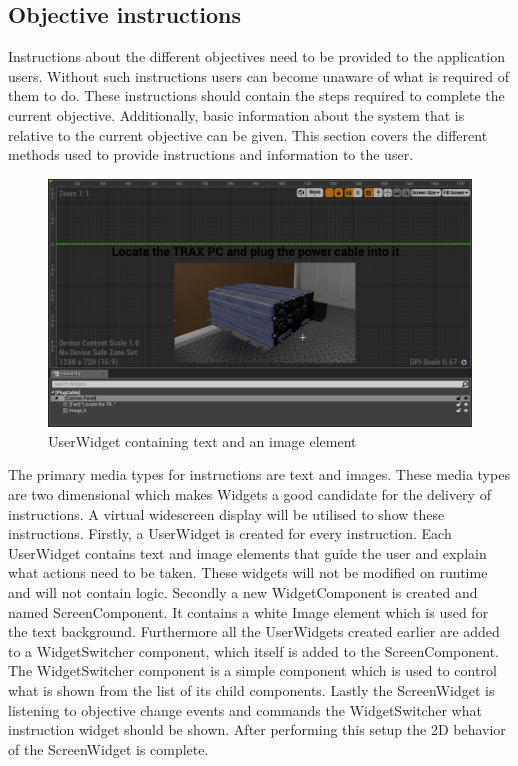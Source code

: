 \documentclass[12pt, a4paper,oneside, nocenter]{thesis}
\begin{document}
\subsection{Objective instructions} \label{objective-instructions-section}
Instructions about the different objectives need to be provided to the application users. Without such instructions users can become unaware of what is required of them to do. These instructions should contain the steps required to complete the current objective. Additionally, basic information about the system that is relative to the current objective can be given. This section covers the different methods used to provide instructions and information to the user.
\begin{figure}[H]
	\includegraphics[width=\textwidth]{user-widget}
	\caption{UserWidget containing text and an image element}
	\label{fig:user-widget}
\end{figure}
\par
The primary media types for instructions are text and images. These media types are two dimensional which makes Widgets a good candidate for the delivery of instructions. A virtual widescreen display will be utilised to show these instructions. Firstly, a UserWidget is created for every instruction. Each UserWidget contains text and image elements that guide the user and explain what actions need to be taken. These widgets will not be modified on runtime and will not contain logic. Secondly a new WidgetComponent is created and named ScreenComponent. It contains a white Image element which is used for the text background. Furthermore all the UserWidgets created earlier are added to a WidgetSwitcher component, which itself is added to the ScreenComponent. The WidgetSwitcher component is a simple component which is used to control what is shown from the list of its child components. Lastly the ScreenWidget is listening to objective change events and commands the WidgetSwitcher what instruction widget should be shown. After performing this setup the 2D behavior of the ScreenWidget is complete.
\end{document}
